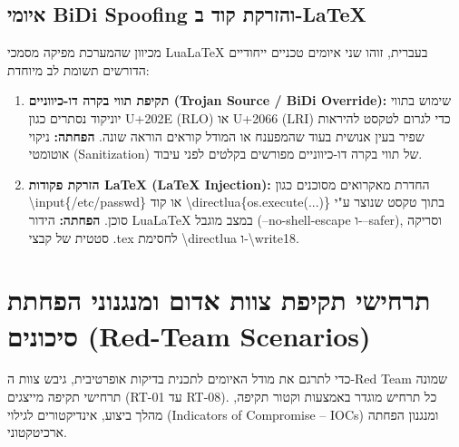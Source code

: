 \subsection{איומי \textenglish{BiDi Spoofing} והזרקת קוד ב-\textenglish{LaTeX}}
מכיוון שהמערכת מפיקה מסמכי \textenglish{LuaLaTeX} בעברית, זוהו שני איומים טכניים ייחודיים הדורשים תשומת לב מיוחדת:
\begin{enumerate}
    \item \textbf{תקיפת תווי בקרה דו-כיווניים (\textenglish{Trojan Source / BiDi Override}):} שימוש בתווי יוניקוד נסתרים כגון \textenglish{U+202E (RLO)} או \textenglish{U+2066 (LRI)} כדי לגרום לטקסט להיראות שפיר בעין אנושית בעוד שהמפענח או המודל קוראים הוראה שונה. \textbf{הפחתה:} ניקוי אוטומטי (\textenglish{Sanitization}) של תווי בקרה דו-כיווניים מפורשים בקלטים לפני עיבוד.
    \item \textbf{הזרקת פקודות \textenglish{LaTeX} (\textenglish{LaTeX Injection}):} החדרת מאקרואים מסוכנים כגון \textenglish{\textbackslash input\{/etc/passwd\}} או קוד \textenglish{\textbackslash directlua\{os.execute(...)\}} בתוך טקסט שנוצר ע"י סוכן. \textbf{הפחתה:} הידור \textenglish{LuaLaTeX} במצב מוגבל (\textenglish{--no-shell-escape} ו-\textenglish{--safer}), וסריקה סטטית של קבצי \textenglish{.tex} לחסימת \textenglish{\textbackslash directlua} ו-\textenglish{\textbackslash write18}.
\end{enumerate}


\section{תרחישי תקיפת צוות אדום ומנגנוני הפחתת סיכונים (\textenglish{Red-Team Scenarios})}
\label{sec:redteam-scenarios}

כדי לתרגם את מודל האיומים לתכנית בדיקות אופרטיבית, גיבש צוות ה-\textenglish{Red Team} שמונה תרחישי תקיפה מייצגים (\textenglish{RT-01} עד \textenglish{RT-08}). כל תרחיש מוגדר באמצעות וקטור תקיפה, מהלך ביצוע, אינדיקטורים לגילוי (\textenglish{Indicators of Compromise -- IOCs}) ומנגנון הפחתה ארכיטקטוני.

